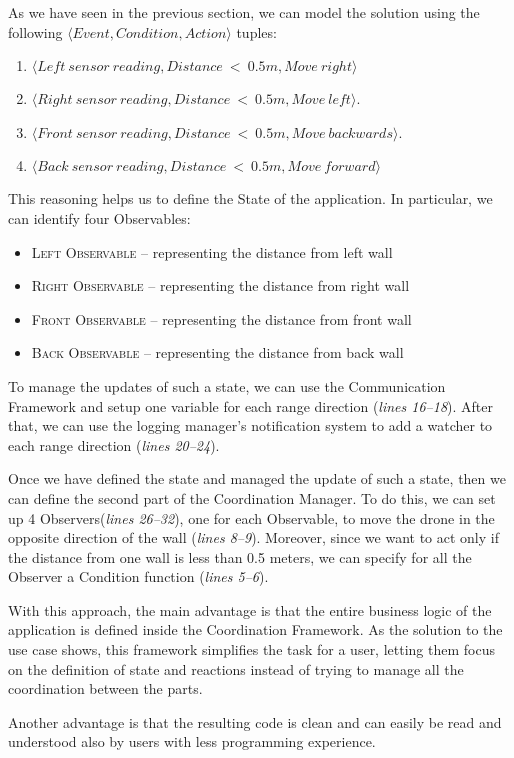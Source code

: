 As we have seen in the previous section, we can model the solution using the following \( \langle Event, Condition, Action \rangle \) tuples:
\begin{enumerate}
    \item \( \langle Left~sensor~reading, Distance~<~0.5m, Move~right \rangle \)
    \item \( \langle Right~sensor~reading, Distance~<~0.5m, Move~left \rangle \).
    \item \( \langle Front~sensor~reading, Distance~<~0.5m, Move~backwards \rangle \).
    \item \( \langle Back~sensor~reading, Distance~<~0.5m, Move~forward \rangle \)
\end{enumerate}

This reasoning helps us to define the State of the application. 
In particular, we can identify four Observables:
\begin{itemize}
    \item \textsc{Left Observable} -- representing the distance from left wall
    \item \textsc{Right Observable} -- representing the distance from right wall
    \item \textsc{Front Observable} -- representing the distance from front wall
    \item \textsc{Back Observable} -- representing the distance from back wall
\end{itemize}

To manage the updates of such a state, we can use the Communication Framework and setup one variable for each range direction (\textit{lines 16--18}).
After that, we can use the logging manager's notification system to add a watcher to each range direction (\textit{lines 20--24}).

Once we have defined the state and managed the update of such a state, then we can define the second part of the Coordination Manager.
To do this, we can set up 4 Observers(\textit{lines 26--32}), one for each Observable, to move the drone in the opposite direction of the wall (\textit{lines 8--9}).
Moreover, since we want to act only if the distance from one wall is less than 0.5 meters, we can specify for all the Observer a Condition function (\textit{lines 5--6}).

\begin{figure}[tb]
    \centering
    
\end{figure}


With this approach, the main advantage is that the entire business logic of the application is defined inside the Coordination Framework.
As the solution to the use case shows, this framework simplifies the task for a user, letting them focus on the definition of state and reactions instead of trying to manage all the coordination between the parts. 

Another advantage is that the resulting code is clean and can easily be read and understood also by users with less programming experience.
